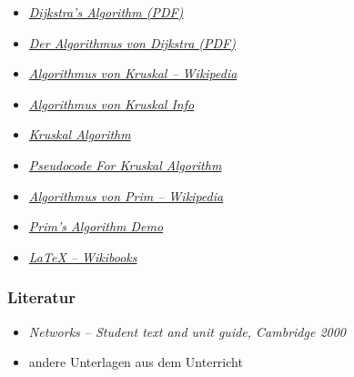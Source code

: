 \documentclass[a4paper,titlepage]{article}
\begin{document}
\begin{itemize}
\item \emph{\href{http://ocw.mit.edu/NR/rdonlyres/Sloan-School-of-Management/15-082JNetwork-OptimizationSpring2003/FC13EFA1-0FE2-4BFB-B019-8939606EDDCC/0/dijkstrasalgorithm.pdf}{Dijkstra’s Algorithm (PDF)}}
\item \emph{\href{http://www.educ.ethz.ch/lehrpersonen/informatik/unterrichtsmaterialien_inf/kommuniation_kryptographie/routing/la3.pdf}{Der Algorithmus von Dijkstra (PDF)}}
\item \emph{\href{http://de.wikipedia.org/wiki/Algorithmus_von_Kruskal}{Algorithmus von Kruskal -- Wikipedia}}
\item \emph{\href{http://infofrosch.info/a/al/algorithmus_von_kruskal.html}{Algorithmus von Kruskal Info}}
\item \emph{\href{http://students.ceid.upatras.gr/~papagel/project/kruskal.htm}{Kruskal Algorithm}}
\item \emph{\href{http://students.ceid.upatras.gr/~papagel/project/pseukrus.htm}{Pseudocode For Kruskal Algorithm}}
\item \emph{\href{http://de.wikipedia.org/wiki/Algorithmus_von_Prim}{Algorithmus von Prim -- Wikipedia}}
\item \emph{\href{http://www.unf.edu/~wkloster/foundations/PrimApplet/PrimApplet.htm}{Prim's Algorithm Demo}}
\item \emph{\href{http://en.wikibooks.org/wiki/LaTeX}{LaTeX -- Wikibooks}}
\end{itemize}

\subsubsection{Literatur}
\begin{itemize}
\item \emph{Networks -- Student text and unit guide, Cambridge 2000}
\item andere Unterlagen aus dem Unterricht
\end{itemize}
\end{document}
